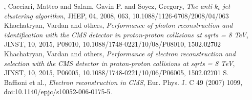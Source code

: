 \begin{thebibliography}{999}
		, Cacciari, Matteo and Salam, Gavin P. and Soyez, Gregory, \emph{The anti-$k_t$ jet clustering algorithm}, JHEP, 04, 2008, 063, 10.1088/1126-6708/2008/04/063
		 Khachatryan, Vardan and others, \emph{Performance of photon reconstruction and identification with the CMS detector in proton-proton collisions at sqrt{s} = 8 TeV}, JINST, 10,  2015, P08010, 10.1088/1748-0221/10/08/P08010, 1502.02702 
		 Khachatryan, Vardan and others, \emph{Performance of electron reconstruction and selection with the CMS detector in proton-proton collisions at sqrt{s} = 8 TeV}, JINST, 10, 2015, P06005, 10.1088/1748-0221/10/06/P06005, 1502.02701
		 S. Baffioni et al., \emph{Electron reconstruction in CMS}, Eur. Phys. J. C 49 (2007) 1099, doi:10.1140/epjc/s10052-006-0175-5.
		

\end{thebibliography}
